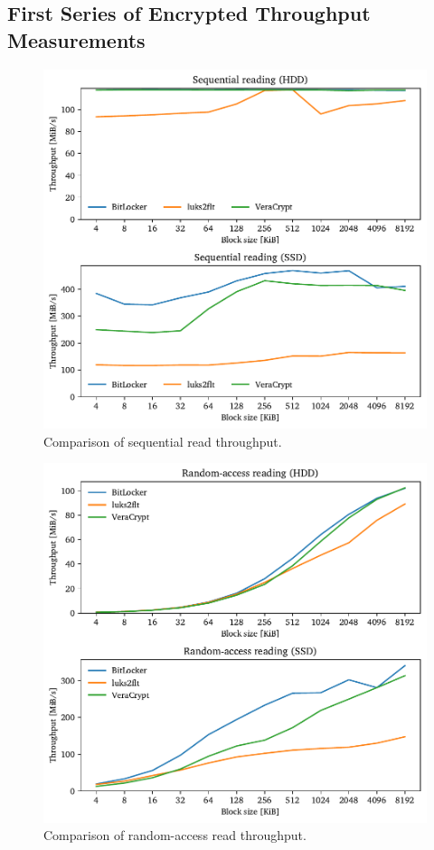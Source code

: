 \subsection{First Series of Encrypted Throughput Measurements}
\label{chap:performance.hwexperiments.encryptedseries1}
\begin{figure}[htb!]
	\center
	\includegraphics[scale=1]{../fig/performance.hwexperiments.beforeoptseq.pdf}
	\caption[
		Comparison of sequential read throughput
	]{
		Comparison of sequential read throughput. 
	}
	\label{fig:performance.hwexperiments.beforeoptseq}
\end{figure}

\begin{figure}[htb!]
	\center
	\includegraphics[scale=1]{../fig/performance.hwexperiments.beforeoptrand.pdf}
	\caption[
		Comparison of random-access read throughput
	]{
		Comparison of random-access read throughput. 
	}
	\label{fig:performance.hwexperiments.beforeoptrand}
\end{figure}

